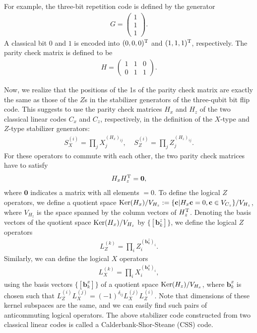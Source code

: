 For example, the three-bit repetition code is defined by the generator
\begin{eqnarray}
G = \left(\begin{array}{c}1 \\ 1 \\ 1 \end{array} \right).
\end{eqnarray}
A classical bit $0$ and $1$ is encoded into $(0,0,0)^{\rm T}$ and $(1,1,1)^{\rm T}$, respectively.
The parity check matrix is defined to be
\begin{eqnarray}
H= \left(
\begin{array}{ccc}
1 & 1 & 0
\\
0 & 1 & 1
\end{array}
\right).
\end{eqnarray}

Now, we realize that the positions of the 1s of the parity check matrix are exactly the same as those of the $Z$s in the stabilizer generators of the three-qubit bit flip code.
This suggests to use the parity check matrices $H_x$ and $H_z$ of the two classical linear codes $C_x$ and $C_z$, respectively, 
in the definition of the $X$-type and $Z$-type stabilizer generators:
\begin{eqnarray}
S_{X}^{(i)} = \prod _{j} X_j^{(H_x)_{ij}},
\;\;\;\;
S_{Z}^{(i)} = \prod _{j} Z_j^{(H_z)_{ij}}.
\end{eqnarray}
For these operators to commute with each other, the two parity check matrices have to satisfy
\begin{eqnarray}
H_x H_z^{\rm T} = \mathbf{0},
\end{eqnarray}
where $\mathbf{0}$ indicates a matrix with all elements $=0$.
To define the logical $Z$ operators, we define a quotient space ${\rm Ker}(H_x)/V_{H_z}:=\{ \mathbf{c}| H_x \mathbf{c} =0, \mathbf{c} \in V_{C_z} \}/V_{H_z}$, where $V_{H_z}$ is the space spanned by the column vectors of $H_{z}^{\rm T}$.
Denoting the basis vectors of the quotient space ${\rm Ker}(H_x)/V_{H_z}$ by $\{ [ \mathbf{b}_k^{z} ]\}$, we define the logical $Z$ operators
\begin{eqnarray}
L_Z^{(k)}=  \prod _{i} Z_i^{(\mathbf{b}^{z}_k)_i}.
\end{eqnarray}
Similarly, we can define the logical $X$ operators
\begin{eqnarray}
L_X^{(k)}=  \prod _{i} X_i^{(\mathbf{b}^{x}_k)_i},
\end{eqnarray}
using the basis vectors $\{ [\mathbf{b}_k^{x}] \}$ of a quotient space ${\rm Ker}(H_z)/V_{H_x}$, where $\mathbf{b}_k^{x}$ is chosen such that 
$L_Z^{(i)} L_X^{(j)} = (-1)^{\delta _{ij}}L_X^{(j)} L_Z^{(i)}$.
Note that dimensions of these kernel subspaces are the same, and we can easily find such pairs of anticommuting logical operators.
The above stabilizer code constructed from two classical linear codes is called a Calderbank-Shor-Steane (CSS) code.

